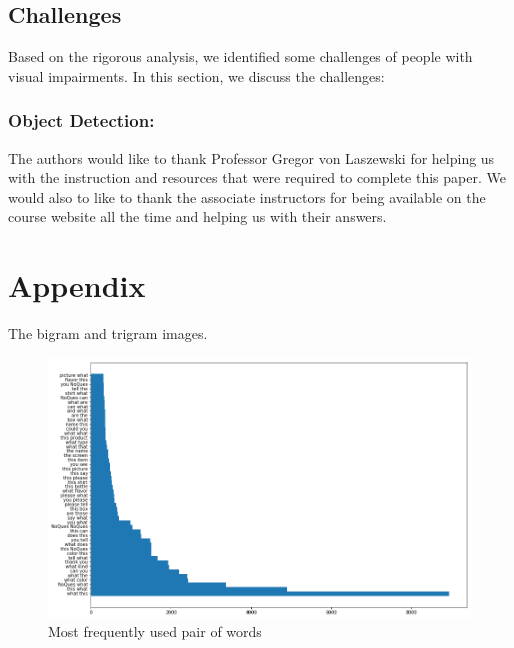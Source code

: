 \documentclass[sigconf]{acmart}
\begin{document}
\subsection{Challenges}
Based on the rigorous analysis, we identified some challenges of people with visual impairments. In this section, we discuss the challenges:

\subsubsection{Object Detection:}


\begin{acks}

The authors would like to thank Professor Gregor von Laszewski for helping us with the instruction and resources that were required to complete this paper. We would also to like to thank the associate instructors for being available on the course website all the time and helping us with their answers.

\end{acks}




 
\newpage
\appendix
\section{Appendix}

The bigram and trigram images. 
\begin{figure}[bp]
        \centering
        \includegraphics[scale=0.45]{images/bigram_all.png}  
        \caption{Most frequently used pair of words} 
          \label{fig:bi_all}   
\end{figure}
\end{document}
